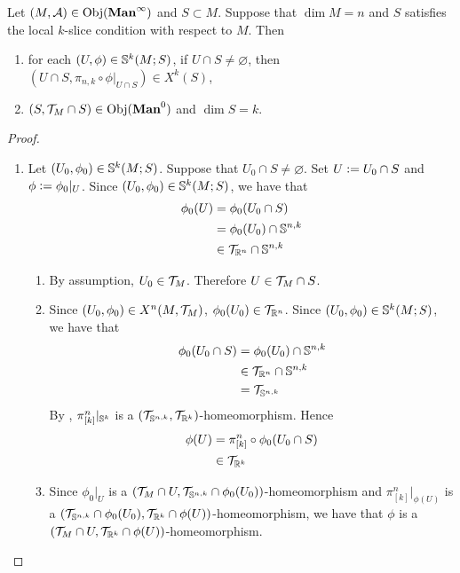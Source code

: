 \documentclass{book}
\begin{document}
	\begin{ex}
		Let $(M, \MA) \in \Obj(\Maninf)$ and $S \subset M$. Suppose that $\dim M = n$ and $S$ satisfies the local $k$-slice condition with respect to $M$. Then 
		\begin{enumerate}
			\item for each $(U, \phi) \in \S^k(M; S)$, if $U \cap S \neq \varnothing$, then $(U \cap S, \pi_{n, k} \circ \phi|_{U \cap S}) \in X^k(S)$, 
			\item $(S, \MT_M \cap S) \in \Obj(\Man0)$ and $\dim S = k$.
		\end{enumerate}
	\end{ex}

	\begin{proof}\
		\begin{enumerate}
			\item 
			Let $(U_0, \phi_0) \in \S^k(M; S)$. Suppose that $U_0 \cap S \neq \varnothing$. Set $U \defeq U_0 \cap S$ and $\phi \defeq \phi_0|_U$. Since $(U_0, \phi_0) \in \S^k(M; S)$, we have that 
			\begin{align*}
				\phi_0(U)
				& = \phi_0(U_0 \cap S) \\
				& = \phi_0(U_0) \cap \S^{n,k} \\
				& \in \MT_{\R^n} \cap \S^{n,k}
			\end{align*}
			\begin{enumerate}
				\item By assumption, $U_0 \in \MT_M$. Therefore $U \in \MT_M \cap S$.
				\item Since $(U_0, \phi_0) \in X^n(M, \MT_M)$, $\phi_0(U_0) \in \MT_{\R^n}$. Since $(U_0, \phi_0) \in \S^k(M; S)$, we have that 
				\begin{align*}
					\phi_0(U_0 \cap S) 
					& = \phi_0(U_0) \cap \S^{n,k} \\
					& \in \MT_{\R^n} \cap \S^{n,k} \\
					& = \MT_{\S^{n,k}}
				\end{align*}
				By , $\pi^n_{[k]}|_{\S^k}$ is a $(\MT_{\S^{n,k}}, \MT_{\R^k})$-homeomorphism. Hence 
				\begin{align*}
					\phi(U)
					& = \pi^n_{[k]} \circ \phi_0 (U_0 \cap S) \\
					& \in \MT_{\R^k}
				\end{align*}
				\item Since $\phi_0|_U$ is a $(\MT_M \cap U, \MT_{\S^{n,k}} \cap \phi_0(U_0))$-homeomorphism and $\pi^n_{[k]}|_{\phi(U)}$ is a $(\MT_{\S^{n,k}} \cap \phi_0(U_0), \MT_{\R^k} \cap \phi(U))$-homeomorphism, we have that $\phi$ is a $(\MT_M \cap U, \MT_{\R^k} \cap \phi(U))$-homeomorphism. 

\end{enumerate}
\end{enumerate}
\end{proof}
\end{document}
